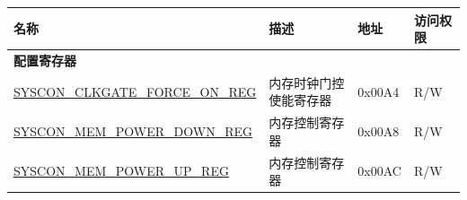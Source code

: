 \begin{longtable}{ | p{6.5cm} | p{5.5cm} | p{1.3cm} | p{2cm} |}
\hline\rowcolor{lightgray}
\textbf{名称} & \textbf{描述} & \textbf{地址} & \textbf{访问权限} \\ \hline
\endhead
\multicolumn{4}{|l|}{\textbf{配置寄存器}} \\ \hline
\hyperref[regdesc:SYSCONCLKGATEFORCEONREG]{SYSCON\_CLKGATE\_FORCE\_ON\_REG} & 内存时钟门控使能寄存器 & 0x00A4 & R/W \\ \hline
\hyperref[regdesc:SYSCONMEMPOWERDOWNREG]{SYSCON\_MEM\_POWER\_DOWN\_REG} & 内存控制寄存器 & 0x00A8 & R/W \\ \hline
\hyperref[regdesc:SYSCONMEMPOWERUPREG]{SYSCON\_MEM\_POWER\_UP\_REG} & 内存控制寄存器 & 0x00AC & R/W \\ \hline
\end{longtable}
